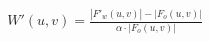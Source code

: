 \documentclass[preview]{standalone}
\begin{document}
\begin{align*}
W'(u,v) = \frac{|F'_w(u,v)| - |F_o(u,v)|}{\alpha \cdot |F_o(u,v)|}
\end{align*}
\end{document}
